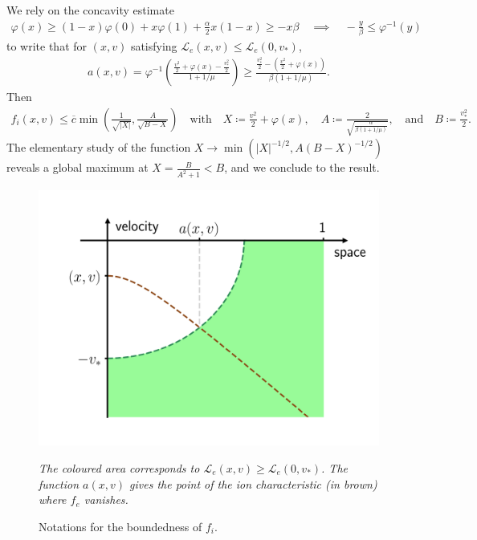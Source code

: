 \documentclass{article}
\numberwithin{equation}{section}
\newcommand{\mysubcaption}[1]{
	\vspace*{5pt}
	\begin{minipage}{0.8\linewidth}
		\begin{center}
			\footnotesize\emph{#1}
		\end{center}
	\end{minipage}
}
\newcommand{\maxfe}{{\overline{c}}} %
\begin{document}
{	We rely on the concavity estimate
	\begin{align*}
		\varphi(x) \geqslant (1 - x) \varphi(0) + x \varphi(1) + \frac{\alpha}{2} x(1-x) \geqslant - x \beta 
		\quad \implies \quad
		-\frac{y}{\beta} \leqslant \varphi^{-1}(y)
	\end{align*}
	to write that for $(x,v)$ satisfying $\mathcal{L}_e(x,v) \leqslant \mathcal{L}_e(0,v_*)$, 
	\begin{align*}
		a(x,v) = \varphi^{-1}\left(\frac{\frac{v^2}{2} + \varphi(x) - \frac{v_*^2}{2}}{1+1/\mu}\right)
		\geqslant \frac{\frac{v_*^2}{2} - (\frac{v^2}{2} + \varphi(x))}{\beta(1+1/\mu)}.
	\end{align*}
	Then 
	\begin{align*}
		f_i(x,v) \leqslant \maxfe \min \left(\frac{1}{\sqrt{|X|}}, \frac{A}{\sqrt{B - X}}\right) 
		\quad \text{with} \quad
		X \coloneqq \frac{v^2}{2} + \varphi(x), \quad A \coloneqq \frac{2}{\sqrt{\frac{\alpha}{\beta(1+1/\mu)}}}, \quad \text{and} \quad B \coloneqq \frac{v_*^2}{2}.
	\end{align*}
	 The elementary study of the function $X \to \min\left(|X|^{-1/2}, A (B-X)^{-1/2}\right)$ reveals a global maximum at $X = \frac{B}{A^2 + 1} < B$, and we conclude to the result.
	 
 	\begin{figure}
 		\centering
 		\includegraphics[width=0.5\linewidth]{images/global_bound_fi}
 		\caption{Notations for the boundedness of $f_i$.}
 		\mysubcaption{The coloured area corresponds to $\mathcal{L}_e(x,v) \geqslant \mathcal{L}_e(0,v_*)$. The function $a(x,v)$ gives the point of the ion characteristic (in brown) where $f_e$ vanishes.}
 		\label{fig:charmaps_domainmap}
 	\end{figure}
}


\end{document}
